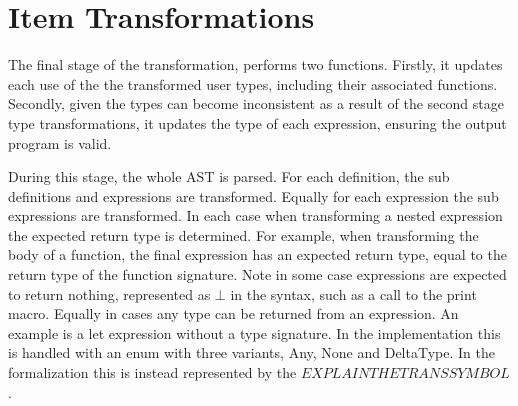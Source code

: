 \documentclass[ oneside,%
                    author={James Elgar},
                    degree={MEng},
                     title={Bidirectional transformer between functional and \\ object-oriented programming in Rust},
                  subtitle={}]{dissertation}
\begin{document}



\section{Item Transformations}
\label{sec:item-trans}

The final stage of the transformation, performs two functions. Firstly, it updates each use of the the transformed user types, including their associated functions. Secondly, given the types can become inconsistent as a result of the second stage type transformations, it updates the type of each expression, ensuring the output program is valid.


During this stage, the whole AST is parsed. For each definition, the sub definitions and expressions are transformed. Equally for each expression the sub expressions are transformed. In each case when transforming a nested expression the expected return type is determined. For example, when transforming the body of a function, the final expression has an expected return type, equal to the return type of the function signature. Note in some case expressions are expected to return nothing, represented as $\bot$ in the syntax, such as a call to the print macro. Equally in cases any type can be returned from an expression. An example is a let expression without a type signature. In the implementation this is handled with an enum with three variants, Any, None and DeltaType. In the formalization this is instead represented by the $EXPLAIN THE TRANS SYMBOL$.
\end{document}
